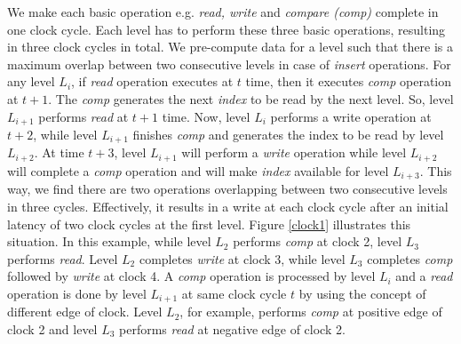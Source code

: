 \documentclass[10pt, conference, compsocconf]{IEEEtran}
\begin{document}
We make each basic operation e.g. {\it read, write} and {\it compare (comp)} complete in one clock cycle.
Each level has to perform these three basic operations, resulting in three clock cycles in total.
We pre-compute data for a level such that there is a maximum overlap between two consecutive levels in case of {\it insert} operations.
For any level $L_i$, if {\it read} operation executes at $t$ time, then it executes {\it comp} operation at $t+1$.
The {\it comp} generates the next {\it index} to be read by the next level.
So, level $L_{i+1}$ performs {\it read} at $t+1$ time.
Now, level $L_i$ performs a write operation at $t+2$, while level $L_{i+1}$ finishes {\it comp} and generates the index to be read by level $L_{i+2}$.
At time $t+3$, level $L_{i+1}$ will perform a {\it write} operation while level $L_{i+2}$ will complete a {\it comp} operation and will make {\it index} available for level $L_{i+3}$.
This way, we find there are two operations overlapping between two consecutive levels in three cycles.
Effectively, it results in a write at each clock cycle after an initial latency of two clock cycles at the first level.
Figure \ref{clock1} illustrates this situation.
In this example, while level $L_2$ performs {\it comp} at clock 2, level $L_3$ performs {\it read}.
Level $L_2$ completes {\it write} at clock 3, while level $L_3$ completes {\it comp} followed by {\it write} at clock 4.
A {\it comp} operation is processed by level $L_i$ and a {\it read} operation is done by level $L_{i+1}$ at same clock cycle $t$ by using the concept of different edge of clock.
Level $L_2$, for example, performs {\it comp} at positive edge of clock 2 and level $L_3$ performs {\it read} at negative edge of clock 2.
\end{document}
